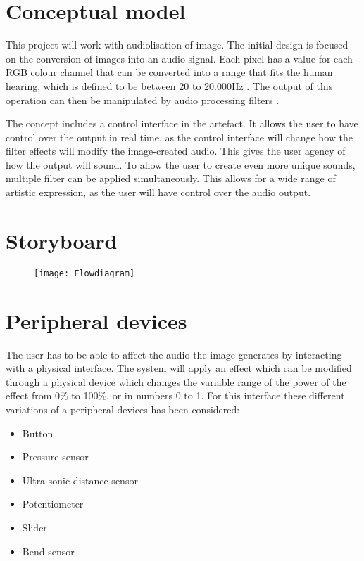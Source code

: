 \section{Conceptual model}
This project will work with audiolisation of image. The initial design is focused on the conversion of images into an audio signal. Each pixel has a value for each RGB colour channel that can be converted into a range that fits the human hearing, which is defined to be between 20 to 20.000Hz \cite{Dsp1997}. The output of this operation can then be manipulated by audio processing filters .

The concept includes a control interface in the artefact. It allows the user to have control over the output in real time, as the control interface will change how the filter effects will modify the image-created audio. This gives the user agency of how the output will sound. To allow the user to create even more unique sounds, multiple filter can be applied simultaneously. This allows for a wide range of artistic expression, as the user will have control over the audio output.

\section{Storyboard}
\begin{figure}[!h] 
\centering
\texttt{[image: Flowdiagram]}
\caption{\label{fig:Flowdiagram} }
\end{figure}

\section{Peripheral devices}
The user has to be able to affect the audio the image generates by interacting with a physical interface. The system will apply an effect which can be modified through a physical device which changes the variable range of the power of the effect from 0\% to 100\%, or in numbers 0 to 1. For this interface these different variations of a peripheral devices has been considered: 

\begin{itemize}
\item Button
\item Pressure sensor
\item Ultra sonic distance sensor
\item Potentiometer
\item Slider
\item Bend sensor
\end{itemize}

